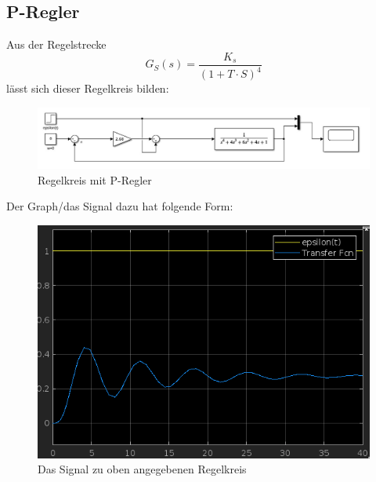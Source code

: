 \documentclass{article}
\begin{document}
		\subsection{P-Regler}
			Aus der Regelstrecke 
			$$G_S(s) = \frac{K_s}{(1 + T\cdot S)^4}$$
			lässt sich dieser Regelkreis bilden:
			\begin{figure}[h]
				\includegraphics[scale=0.5, center]{4_a_Blockschaltbild.png}
				\caption{Regelkreis mit P-Regler}
				\label{fig33: Blockschaltbild_P_Regler}
			\end{figure}
			Der Graph/das Signal dazu hat folgende Form:
			\begin{figure}[h]
				\includegraphics[scale = 0.6, center]{4_a_Graph.png}
				\caption{Das Signal zu oben angegebenen Regelkreis}
				\label{fig34: 4_a_Graph}
			\end{figure}
\newpage
\end{document}
